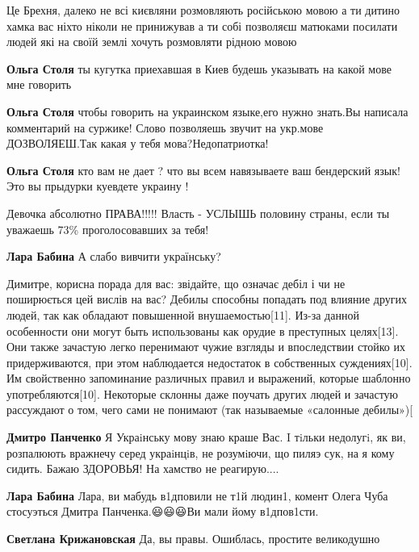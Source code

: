 \begin{itemize}

Це Брехня, далеко не всі києвляни розмовляють російською мовою а ти дитино
хамка вас ніхто ніколи не принижував а ти собі позволяєш матюками посилати
людей які на своїй землі хочуть розмовляти рідною мовою

\begin{itemize}
\textbf{Ольга Столя} ты кугутка приехавшая в Киев будешь указывать на какой мове мне говорить

\textbf{Ольга Столя} чтобы говорить на украинском языке,его нужно знать.Вы
написала комментарий на суржике! Слово позволяешь звучит на укр.мове
ДОЗВОЛЯЕШ.Так какая у тебя мова?Недопатриотка!

\textbf{Ольга Столя} кто вам не дает ? что вы всем навязываете ваш бендерский
язык! Это вы прыдурки куевдете украину !
\end{itemize}

Девочка абсолютно ПРАВА!!!!! Власть - УСЛЫШЬ половину страны, если ты уважаешь
73\% проголосовавших за тебя!

\begin{itemize}
\textbf{Лара Бабина} А слабо вивчити українську?

Димитре, корисна порада для вас: звідайте, що означає дебіл і чи не поширюється
цей вислів на вас?  Дебилы способны попадать под влияние других людей, так как
обладают повышенной внушаемостью[11]. Из-за данной особенности они могут быть
использованы как орудие в преступных целях[13]. Они также зачастую легко
перенимают чужие взгляды и впоследствии стойко их придерживаются, при этом
наблюдается недостаток в собственных суждениях[10]. Им свойственно запоминание
различных правил и выражений, которые шаблонно употребляются[10]. Некоторые
склонны даже поучать других людей и зачастую рассуждают о том, чего сами не
понимают (так называемые «салонные дебилы»)[

\textbf{Дмитро Панченко}
Я Украiнську мову знаю краше Вас. I тiльки недолугi, як ви, розпалюють вражнечу серед украiнцiв, не розумiючи, що пиляэ сук, на я кому сидить. Бажаю ЗДОРОВЬЯ! На хамство не реагирую....

\textbf{Лара Бабина} Лара, ви мабудь в1дповили не т1й людин1, комент Олега Чуба
стосуэться Дмитра Панченка.😃😃😃Ви мали йому в1дпов1сти.

\textbf{Светлана Крижановская}
Да, вы правы. Ошиблась, простите великодушно


\end{itemize}
\end{itemize}
